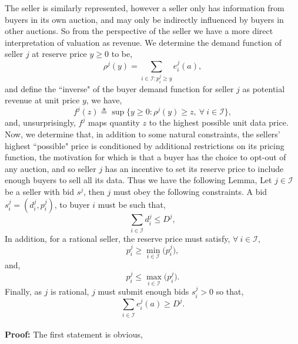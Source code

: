 \documentclass[12pt]{article}
\theoremstyle{definition}
\newcommand{\mcI}{\mathcal{I}}
\begin{document}
\begin{multicols}{2}
The seller is similarly represented, however a seller only has
information from buyers in its own auction, and may only be indirectly influenced by
buyers in other auctions. So from the perspective of the
seller we have a more direct interpretation of valuation as revenue.
We determine the demand function of seller $j$ at reserve price $y\ge 0$ to be,
\begin{equation}\label{datademand}
    \rho^j(y) = \sum_{i\in\mcI : p_i^j\ge y} e_i^j(a), 
\end{equation}
and define the ``inverse" of the buyer demand function for seller $j$ as
potential revenue at unit price $y$, we have, 
\begin{equation}\label{sellerinversedemand}
    f^j(z) \triangleq \sup\big\lbrace y\ge 0:
        \rho^j(y) \ge z, \ \forall \ i \in \mcI\big\rbrace,
\end{equation}
and, unsurprisingly, $f^j$ maps quantity $z$ to the highest possible unit data
price. Now, we determine that, in addition to some natural constraints, the sellers' highest
``possible" price is conditioned by
additional restrictions on its pricing function, the motivation for which is
that a buyer has the choice to opt-out of any auction, and so seller $j$ has an
incentive to set its reserve price to include enough buyers to sell all its
data. Thus we have the following Lemma,
{
\label{sellerconstraints}
Let $j\in\mcI$ be a seller with bid $s^j$, then $j$ must obey the following constraints.
A bid $s_i^j= (d_i^j, p_i^j)$, to buyer $i$ must be such that,
\begin{equation}\label{datacapmax}
    \sum_{i\in\mcI} d^j_i \le D^j,
\end{equation}
In addition, for a rational seller, the reserve price must
satisfy, $\forall \ i\in \mcI$,
\begin{equation}\label{reservepricemin}
   p_i^j \ge \min_{i\in\mcI}\big(p_i^j),
\end{equation}
and,
\begin{equation}\label{reservepricemax}
   p_i^j \le \max_{i\in\mcI}\big(p_i^j).
\end{equation}
Finally, as $j$ is rational, $j$ must submit enough bids $s_i^j >0$ so that,
\begin{equation}\label{datacapmin}
    \displaystyle\sum_{i\in\mcI} e_i^j(a) \ge D^j.
\end{equation}
}\\
\textbf{Proof:}
The first statement is obvious, 

\end{multicols}
\end{document}
